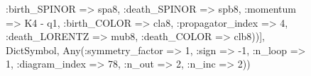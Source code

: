 \documentclass{revtex4}
\begin{document}
\begin{figure}[!htb]
\begin{center}
{:birth_SPINOR => spa8, :death_SPINOR => spb8, :momentum => K4 - q1, :birth_COLOR => cla8, :propagator_index => 4, :death_LORENTZ => mub8, :death_COLOR => clb8))], Dict{Symbol, Any}(:symmetry_factor => 1, :sign => -1, :n_loop => 1, :diagram_index => 78, :n_out => 2, :n_inc => 2)) 
}
\end{center}
\end{figure}
\end{document}
